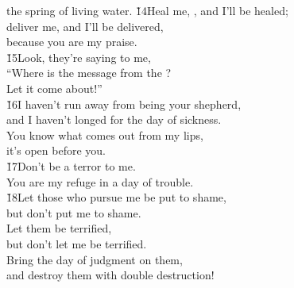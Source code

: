 \begin{poetry}
\poemll    the spring of living water.
\poeml \v{14}Heal me, , and I'll be healed; \\
\poemll    deliver me, and I'll be delivered, \\
\poemlll       because you are my praise. \\
\poeml \v{15}Look, they're saying to me, \\
\poemll    ``Where is the message from the ? \\
\poemlll       Let it come about!'' \\
\poeml \v{16}I haven't run away from being your shepherd, \\
\poemll    and I haven't longed for the day of sickness. \\
\poeml You know what comes out from my lips, \\
\poemll    it's open before you. \\
\poeml \v{17}Don't be a terror to me. \\
\poemll    You are my refuge in a day of trouble. \\
\poeml \v{18}Let those who pursue me be put to shame, \\
\poemll    but don't put me to shame. \\
\poeml Let them be terrified, \\
\poemll    but don't let me be terrified. \\
\poeml Bring the day of judgment on them, \\
\poemll    and destroy them with double destruction!
\end{poetry}

